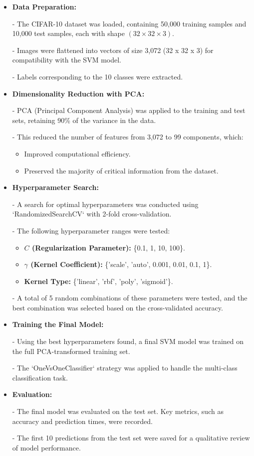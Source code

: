 \documentclass[lettersize,journal]{IEEEtran}
\begin{document}
\begin{itemize}
    \item \textbf{Data Preparation:} 
   
    - The CIFAR-10 dataset was loaded, containing 50,000 training samples and 10,000 test samples, each with shape $(32 \times 32 \times 3)$. 
    
    - Images were flattened into vectors of size 3,072 (32 x 32 x 3) for compatibility with the SVM model. 
    
    - Labels corresponding to the 10 classes were extracted.

    \item \textbf{Dimensionality Reduction with PCA:}
    
    - PCA (Principal Component Analysis) was applied to the training and test sets, retaining 90\% of the variance in the data. 
    
    - This reduced the number of features from 3,072 to 99 components, which:
        \begin{itemize}
            \item Improved computational efficiency.
            \item Preserved the majority of critical information from the dataset.
        \end{itemize}

    \item \textbf{Hyperparameter Search:}
    
    - A search for optimal hyperparameters was conducted using `RandomizedSearchCV` with 2-fold cross-validation. 
    
    - The following hyperparameter ranges were tested:
        \begin{itemize}
            \item \textbf{$C$ (Regularization Parameter):} \{0.1, 1, 10, 100\}.
            \item \textbf{$\gamma$ (Kernel Coefficient):} \{'scale', 'auto', 0.001, 0.01, 0.1, 1\}.
            \item \textbf{Kernel Type:} \{'linear', 'rbf', 'poly', 'sigmoid'\}.
        \end{itemize}
    
    - A total of 5 random combinations of these parameters were tested, and the best combination was selected based on the cross-validated accuracy.

    \item \textbf{Training the Final Model:}
    
    - Using the best hyperparameters found, a final SVM model was trained on the full PCA-transformed training set.
    
    - The `OneVsOneClassifier` strategy was applied to handle the multi-class classification task.

    \item \textbf{Evaluation:}
    
    - The final model was evaluated on the test set. Key metrics, such as accuracy and prediction times, were recorded.
    
    - The first 10 predictions from the test set were saved for a qualitative review of model performance.
\end{itemize}
\end{document}
